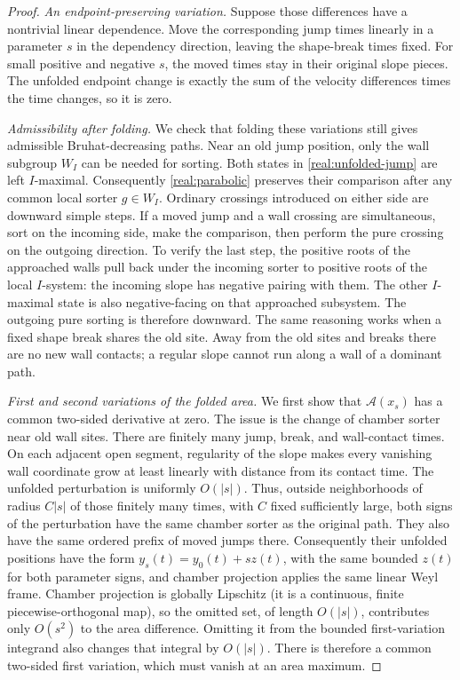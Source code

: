 \begin{proof}
\emph{An endpoint-preserving variation.}
Suppose those differences have a nontrivial linear dependence.  Move
the corresponding jump times linearly in a parameter $s$ in the
dependency direction, leaving the shape-break times fixed.  For small
positive and negative $s$, the moved times stay in their original
slope pieces.  The unfolded endpoint change is exactly the sum of
the velocity differences times the time changes, so it is zero.

\emph{Admissibility after folding.}
We check that folding these variations still gives admissible
Bruhat-decreasing paths.  Near an old jump position, only the wall
subgroup $W_I$ can be needed for sorting.  Both states in
\eqref{real:unfolded-jump} are left $I$-maximal.  Consequently
\eqref{real:parabolic} preserves their comparison after any common
local sorter $g\in W_I$.  Ordinary crossings introduced on either
side are downward simple steps.  If a moved jump and a wall crossing
are simultaneous, sort on the incoming side, make the comparison,
then perform the pure crossing on the outgoing direction.  To verify
the last step, the positive roots of the approached walls pull back
under the incoming sorter to positive roots of the local $I$-system:
the incoming slope has negative pairing with them.  The other
$I$-maximal state is also negative-facing on that approached
subsystem.  The outgoing pure sorting is therefore downward.  The
same reasoning works when a fixed shape break shares the old site.
Away from the old sites and breaks there are no new wall contacts;
a regular slope cannot run along a wall of a dominant path.

\emph{First and second variations of the folded area.}
We first show that $\mathcal A(x_s)$ has a common two-sided derivative
at zero.  The issue is the change of chamber sorter near old wall
sites.  There
are finitely many jump, break, and wall-contact times.  On each
adjacent open segment, regularity of the slope makes every vanishing
wall coordinate grow at least linearly with distance from its contact
time.  The unfolded perturbation is uniformly $O(|s|)$.  Thus, outside
neighborhoods of radius $C|s|$ of those finitely many times, with $C$
fixed sufficiently large, both signs of the perturbation have the
same chamber sorter as the original path.  They also have the same
ordered prefix of moved jumps there.  Consequently their unfolded
positions have the form $y_s(t)=y_0(t)+s z(t)$, with the same bounded
$z(t)$ for both parameter signs, and chamber projection applies the
same linear Weyl frame.  Chamber projection is globally Lipschitz
(it is a continuous, finite piecewise-orthogonal map), so the omitted
set, of length $O(|s|)$, contributes only $O(s^2)$ to the area
difference.  Omitting it from the bounded first-variation integrand
also changes that integral by $O(|s|)$.  There is therefore a common
two-sided first variation, which must vanish at an area maximum.


\end{proof}
